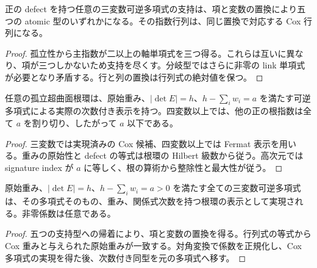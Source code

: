 \begin{theorem}[三変数可逆多項式の五つの支持型]
\label{thm:invertible-support}
\leanok
正の defect を持つ任意の三変数可逆多項式の支持は、項と変数の置換により五つの atomic 型のいずれかになる。その指数行列は、同じ置換で対応する Cox 行列になる。
\end{theorem}
\begin{proof}
\leanok
{}
孤立性から主指数が二以上の軸単項式を三つ得る。これらは互いに異なり、項が三つしかないため支持を尽くす。分岐型ではさらに非零の link 単項式が必要となり矛盾する。行と列の置換は行列式の絶対値を保つ。
\end{proof}

\begin{theorem}[全ての根環の主可逆表示]
\label{thm:principal-presentation}
\leanok
任意の孤立超曲面根環は、原始重み、$|\det E|=h$、$h-\sum_iw_i=a$ を満たす可逆多項式による実際の次数付き表示を持つ。四変数以上では、他の正の根指数は全て $a$ を割り切り、したがって $a$ 以下である。
\end{theorem}
\begin{proof}
\leanok
{}
三変数では実現済みの Cox 候補、四変数以上では Fermat 表示を用いる。重みの原始性と defect の等式は根環の Hilbert 級数から従う。高次元では signature index が $a$ に等しく、根の算術から整除性と最大性が従う。
\end{proof}

\begin{theorem}[与えられた三変数可逆多項式の実現]
\label{thm:invertible-converse}
\leanok
原始重み、$|\det E|=h$、$h-\sum_iw_i=a>0$ を満たす全ての三変数可逆多項式は、その多項式そのもの、重み、関係式次数を持つ根環の表示として実現される。非零係数は任意である。
\end{theorem}
\begin{proof}
\leanok
{}
五つの支持型への帰着により、項と変数の置換を得る。行列式の等式から Cox 重みと与えられた原始重みが一致する。対角変換で係数を正規化し、Cox 多項式の実現を得た後、次数付き同型を元の多項式へ移す。
\end{proof}

